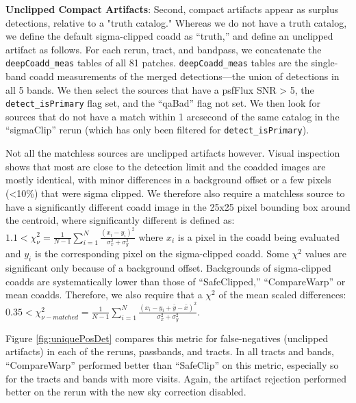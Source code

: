 \documentclass[DM,authoryear,toc]{lsstdoc}
\begin{document}
\textbf{Unclipped Compact Artifacts}: Second, compact artifacts appear as surplus detections, relative to a "truth catalog."
Whereas we do not have a truth catalog, we define the default sigma-clipped coadd as ``truth,'' and define an unclipped artifact as follows.
For each rerun, tract, and bandpass, we concatenate the \texttt{deepCoadd\_meas} tables of all 81 patches.
\texttt{deepCoadd\_meas} tables are the single-band coadd measurements of the merged detections---the union of detections in all 5 bands.
We then select the sources that have a psfFlux SNR > 5, the \texttt{detect\_isPrimary} flag set, and the ``qaBad'' flag not set.
We then look for sources that do not have a match within 1 arcsecond of the same catalog in the ``sigmaClip'' rerun (which has only been filtered for \texttt{detect\_isPrimary}).

Not all the matchless sources are unclipped artifacts however. Visual inspection shows that most are close to the detection limit and the coadded images are mostly identical, with minor differences in a background offset or a few pixels (<10\%)  that were sigma clipped.
We therefore also require a matchless source to have a significantly different coadd image in the 25x25 pixel bounding box around the centroid, where significantly different is defined as:
$1.1 < \chi^2_{\nu} = \frac{1}{N-1}\sum^{N}_{i=1} \frac{{(x_i - y_i)}^2}{\sigma_x^2 + \sigma_y^2}$
where $x_i$ is a pixel in the coadd being evaluated and $y_i$ is the corresponding pixel on the sigma-clipped coadd.
Some $\chi^2$ values are significant only because of a background offset. Backgrounds of sigma-clipped coadds are systematically lower than those of ``SafeClipped,'' ``CompareWarp'' or mean coadds.
Therefore, we also require that a $\chi^2$ of the mean scaled differences:
$0.35 < \chi^2_{\nu-matched} = \frac{1}{N-1}\sum^{N}_{i=1} \frac{{(x_i - y_i  + \bar{y} - \bar{x})}^2}{\sigma_x^2 + \sigma_y^2}$.

Figure \ref{fig:uniquePosDet} compares this metric for false-negatives (unclipped artifacts) in each of the reruns, passbands, and tracts.
In all tracts and bands, ``CompareWarp'' performed better than ``SafeClip'' on this metric, especially so for the tracts and bands with more visits.
Again, the artifact rejection performed better on the rerun with the new sky correction disabled.
\end{document}
